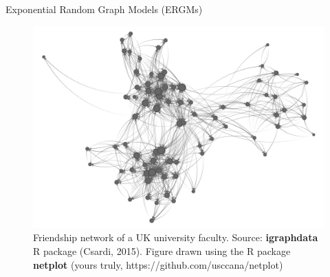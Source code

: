 \documentclass[10pt,ignorenonframetext,aspectratio=169,]{beamer}
\begin{document}
\begin{frame}{Exponential Random Graph Models (ERGMs)}
\protect\hypertarget{exponential-random-graph-models-ergms}{}

\begin{figure}
\centering
\includegraphics[height=.7\textheight]{ukfaculty-igraph.png}
\caption{Friendship network of a UK university faculty. Source: \textbf{igraphdata} R package (Csardi, 2015). Figure drawn using the R package \textbf{netplot} (yours truly, https://github.com/usccana/netplot)}
\end{figure}

\end{frame}
\end{document}
